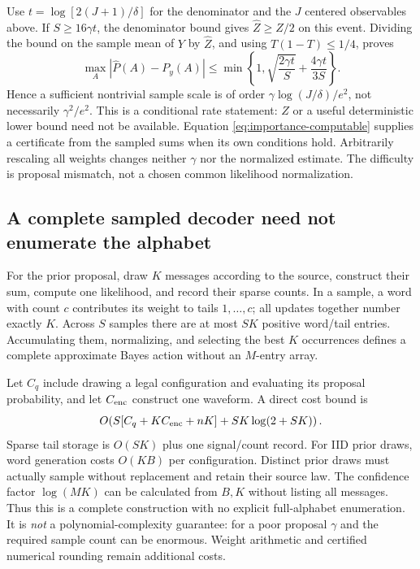 \documentclass[10pt,a4paper]{article}
\begin{document}
Use $t=\log[2(J+1)/\delta]$ for the denominator and the $J$ centered observables above.
If $S\geq16\gamma t$, the denominator bound gives $\widehat Z\geq Z/2$ on this event. Dividing the
bound on the sample mean of $Y$ by $\widehat Z$, and using $T(1-T)\leq1/4$, proves
\begin{equation}
 \max_A|\widehat P(A)-P_y(A)|
 \leq \min\!\left\{1,\sqrt{\frac{2\gamma t}{S}}+
                         \frac{4\gamma t}{3S}\right\}.
 \label{eq:importance-concentration}
\end{equation}
Hence a sufficient nontrivial sample scale is of order $\gamma\log(J/\delta)/e^2$, not necessarily
$\gamma^2/e^2$. This is a conditional rate statement: $Z$ or a useful deterministic lower bound need not
be available. Equation \eqref{eq:importance-computable} supplies a certificate from the sampled sums when
its own conditions hold. Arbitrarily rescaling all weights changes neither $\gamma$ nor the normalized
estimate. The difficulty is proposal mismatch, not a chosen common likelihood normalization.

\subsection{A complete sampled decoder need not enumerate the alphabet}
For the prior proposal, draw $K$ messages according to the source, construct their sum, compute one
likelihood, and record their sparse counts. In a sample, a word with count $c$ contributes its weight to
tails $1,\ldots,c$; all updates together number exactly $K$. Across $S$ samples there are at most $SK$
positive word/tail entries. Accumulating them, normalizing, and selecting the best $K$ occurrences defines
a complete approximate Bayes action without an $M$-entry array.

Let $C_q$ include drawing a legal configuration and evaluating its proposal probability, and let
$C_{\rm enc}$ construct one waveform. A direct cost bound is
\[
 O\!\left(S[C_q+K C_{\rm enc}+nK]+SK\log(2+SK)\right).
\]
Sparse tail storage is $O(SK)$ plus one signal/count record. For IID prior draws, word generation costs
$O(KB)$ per configuration. Distinct prior draws must actually sample without replacement and retain their
source law. The confidence factor $\log(MK)$ can be calculated from $B,K$ without listing all messages.
Thus this is a complete construction with no explicit full-alphabet enumeration. It is \emph{not} a
polynomial-complexity guarantee: for a poor proposal $\gamma$ and the required sample count can be enormous.
Weight arithmetic and certified numerical rounding remain additional costs.
\end{document}
